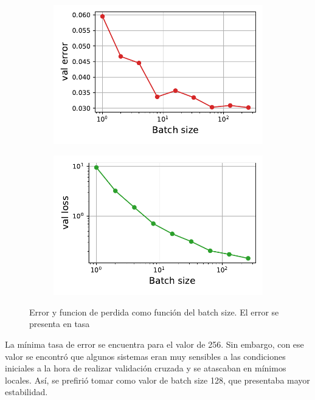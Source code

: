 \documentclass[11pt]{article}
\begin{document}
\begin{figure}[h]
    \centering
    \begin{subfigure}[c]{0.40\textwidth}
        \includegraphics[width=\textwidth]{batchSizeAnalError.pdf}
        \caption{}
        \label{fig:bsError}
    \end{subfigure}
    \begin{subfigure}[c]{0.4\textwidth}
        \includegraphics[width=\textwidth]{batchSizeAnalLoss.pdf}
        \caption{}
        \label{fig:bsLoss}
    \end{subfigure}
    \caption{Error y funcion de perdida como función del batch size. El error se presenta en tasa}
\end{figure}
La mínima tasa de error se encuentra para el valor de 256. Sin embargo, con ese valor se encontró que algunos sistemas eran muy sensibles a las condiciones iniciales a la hora de realizar validación cruzada y se atascaban en mínimos locales. Así, se prefirió tomar como valor de batch size 128, que presentaba mayor estabilidad.
\end{document}

